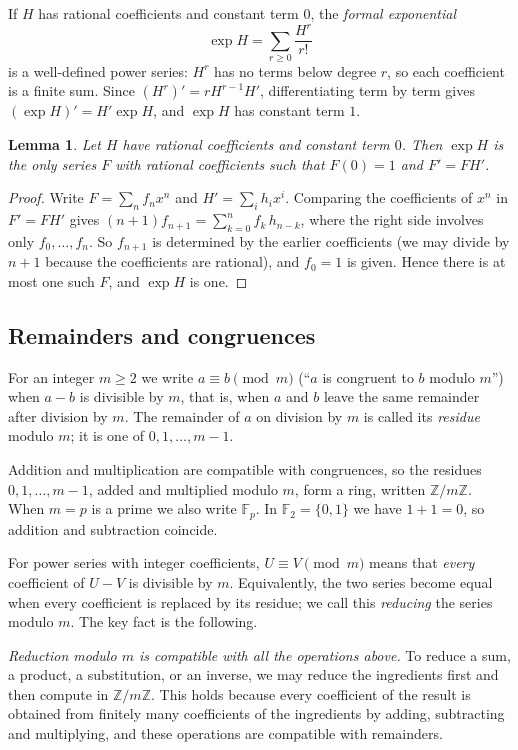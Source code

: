 \documentclass[11pt,a4paper]{article}
\newtheorem{lemma}[theorem]{Lemma}
\theoremstyle{definition}
\theoremstyle{remark}
\newcommand{\Z}{\mathbb{Z}}
\newcommand{\F}{\mathbb{F}}
\begin{document}
If $H$ has rational coefficients and constant term $0$, the \emph{formal exponential}
\[
\exp H=\sum_{r\ge0}\frac{H^r}{r!}
\]
is a well-defined power series: $H^r$ has no terms below degree $r$, so each coefficient is a finite sum. Since
$(H^r)'=rH^{r-1}H'$, differentiating term by term gives $(\exp H)'=H'\exp H$, and $\exp H$ has constant term $1$.

\begin{lemma}\label{lem:ode}
Let $H$ have rational coefficients and constant term $0$. Then $\exp H$ is the only series $F$ with rational coefficients
such that $F(0)=1$ and $F'=FH'$.
\end{lemma}

\begin{proof}
Write $F=\sum_nf_nx^n$ and $H'=\sum_ih_ix^i$. Comparing the coefficients of $x^n$ in $F'=FH'$ gives
$(n+1)f_{n+1}=\sum_{k=0}^{n}f_k\,h_{n-k}$, where the right side involves only $f_0,\dots,f_n$.
So $f_{n+1}$ is determined by the earlier coefficients (we may divide by $n+1$ because the coefficients are rational),
and $f_0=1$ is given. Hence there is at most one such $F$, and $\exp H$ is one.
\end{proof}

\subsection{Remainders and congruences}
For an integer $m\ge2$ we write $a\equiv b\pmod m$ (``$a$ is congruent to $b$ modulo $m$'') when $a-b$ is divisible by
$m$, that is, when $a$ and $b$ leave the same remainder after division by $m$. The remainder of $a$ on division by
$m$ is called its \emph{residue} modulo $m$; it is one of $0,1,\dots,m-1$.

Addition and multiplication are compatible with congruences, so the residues $0,1,\dots,m-1$, added and multiplied
modulo $m$, form a ring, written $\Z/m\Z$. When $m=p$ is a prime we also write $\F_p$. In $\F_2=\{0,1\}$ we have $1+1=0$,
so addition and subtraction coincide.

For power series with integer coefficients, $U\equiv V\pmod m$ means that \emph{every} coefficient of $U-V$ is
divisible by $m$. Equivalently, the two series become equal when every coefficient is replaced by its residue; we call
this \emph{reducing} the series modulo $m$. The key fact is the following.

\emph{Reduction modulo $m$ is compatible with all the operations above.} To reduce a sum, a product, a substitution, or
an inverse, we may reduce the ingredients first and then compute in $\Z/m\Z$. This holds because every
coefficient of the result is obtained from finitely many coefficients of the ingredients by adding, subtracting and
multiplying, and these operations are compatible with remainders.
\end{document}
